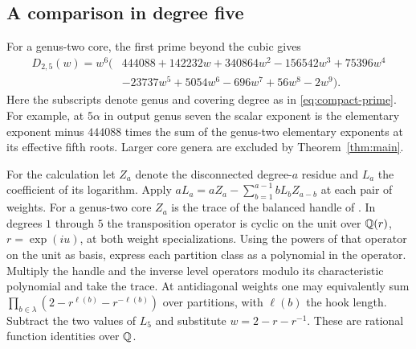 \subsection{A comparison in degree five}
For a genus-two core, the first prime beyond the cubic gives
\begin{align*}
 D_{2,5}(w)=w^6\big(&444088+142232w+340864w^2-156542w^3+75396w^4\\
                    &-23737w^5+5054w^6-696w^7+56w^8-2w^9\big).
\end{align*}
Here the subscripts denote genus and covering degree as in \eqref{eq:compact-prime}. For example, at $5\alpha$ in output genus
seven the scalar exponent is the elementary exponent minus $444088$
times the sum of the genus-two elementary exponents at its effective
fifth roots. Larger core genera are excluded by Theorem~\ref{thm:main}.

For the calculation let $Z_a$ denote the disconnected degree-$a$
residue and $L_a$ the coefficient of its logarithm. Apply
$aL_a=aZ_a-\sum_{b=1}^{a-1}b L_b Z_{a-b}$ at each pair of weights.
For a genus-two core $Z_a$ is the trace of the balanced handle
of \cite[\S\S5--8]{BP}. In degrees $1$ through $5$ the transposition
operator is cyclic on the unit over $\mathbb Q(r)$, $r=\exp(iu)$, at both
weight specializations. Using the powers of that operator on the unit
as basis, express each partition class as a polynomial in the operator.
Multiply the handle and the inverse level operators modulo its
characteristic polynomial and take the trace. At antidiagonal weights
one may equivalently sum $\prod_{b\in\lambda}(2-r^{\ell(b)}-
r^{-\ell(b)})$ over partitions, with $\ell(b)$ the hook length.
Subtract the two values of $L_5$ and substitute $w=2-r-r^{-1}$.
These are rational function identities over $\mathbb Q$.
